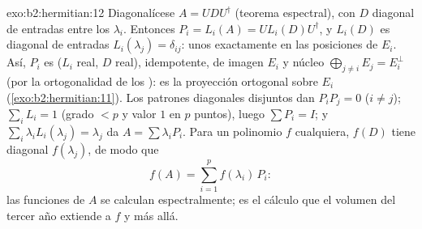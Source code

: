 \begin{solution}{exo:b2:hermitian:12}
Diagonalícese $A = U D U^\dagger$ (teorema espectral), con $D$
diagonal de entradas entre los $\lambda_i$. Entonces $P_i = L_i(A) =
U L_i(D)U^\dagger$, y $L_i(D)$ es diagonal de entradas
$L_i(\lambda_j) = \delta_{ij}$: unos exactamente en las posiciones de
$E_i$. Así, $P_i$ es  ($L_i$ real, $D$ real), idempotente,
de imagen $E_i$ y núcleo $\bigoplus_{j\neq i}E_j = E_i^\perp$ (por la
ortogonalidad de los ): es la proyección ortogonal
sobre $E_i$ (\cref{exo:b2:hermitian:11}). Los patrones diagonales
disjuntos dan $P_iP_j = 0$ ($i \neq j$); $\sum_i L_i = 1$ (grado $<
p$ y valor $1$ en $p$ puntos), luego $\sum P_i = I$; y $\sum_i
\lambda_iL_i(\lambda_j) = \lambda_j$ da $A = \sum \lambda_iP_i$. Para
un polinomio $f$ cualquiera, $f(D)$ tiene diagonal $f(\lambda_j)$, de
modo que
\[
f(A) = \sum_{i=1}^{p} f(\lambda_i)\,P_i :
\]
las funciones de $A$ se calculan espectralmente; es el cálculo que el
volumen del tercer año extiende a $f$  y más allá.
\end{solution}

